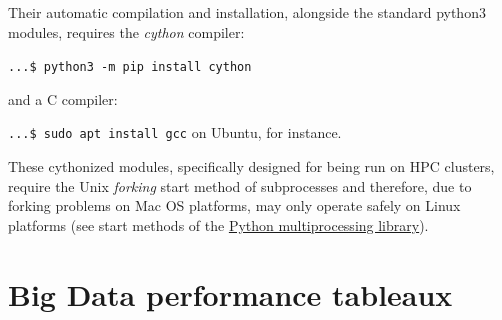 Their automatic compilation and installation, alongside the standard \Digraph python3 modules, requires the \emph{cython} compiler:

\texttt{...\$ python3 -m pip install cython}

\noindent and a C compiler:

\texttt{...\$ sudo apt install gcc} on Ubuntu, for instance.

These cythonized modules, specifically designed for being run on HPC clusters, require the Unix \emph{forking} start method of subprocesses and therefore, due to forking problems on Mac OS platforms, may only operate safely on Linux platforms (see start methods of the \href{https://docs.python.org/3/library/multiprocessing.html#contexts-and-start-methods}{Python multiprocessing library}).

\section{Big Data performance tableaux}
\label{sec:11.2}

